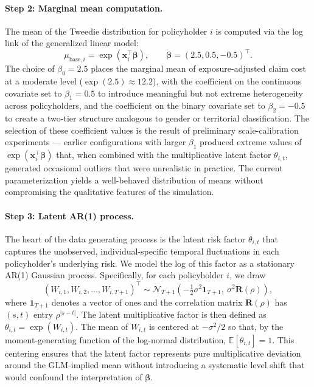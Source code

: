 \documentclass{sfuthesis}
\numberwithin{equation}{chapter}
\begin{document}
\paragraph{Step 2: Marginal mean computation.}
The mean of the Tweedie distribution for policyholder $i$ is computed via the log link of the generalized linear model:
\begin{equation}
\mu_{\text{base}, i} = \exp(\bm{x}_i^\top \bm{\beta}), \qquad \bm{\beta} = (2.5, 0.5, -0.5)^\top.
\label{eq:baseline}
\end{equation}
The choice of $\beta_0 = 2.5$ places the marginal mean of exposure-adjusted claim cost at a moderate level ($\exp(2.5) \approx 12.2$), with the coefficient on the continuous covariate set to $\beta_1 = 0.5$ to introduce meaningful but not extreme heterogeneity across policyholders, and the coefficient on the binary covariate set to $\beta_2 = -0.5$ to create a two-tier structure analogous to gender or territorial classification. The selection of these coefficient values is the result of preliminary scale-calibration experiments --- earlier configurations with larger $\beta_1$ produced extreme values of $\exp(\bm{x}_i^\top \bm{\beta})$ that, when combined with the multiplicative latent factor $\theta_{i,t}$, generated occasional outliers that were unrealistic in practice. The current parameterization yields a well-behaved distribution of means without compromising the qualitative features of the simulation.

\paragraph{Step 3: Latent AR(1) process.}
The heart of the data generating process is the latent risk factor $\theta_{i,t}$ that captures the unobserved, individual-specific temporal fluctuations in each policyholder's underlying risk. We model the log of this factor as a stationary AR(1) Gaussian process. Specifically, for each policyholder $i$, we draw
\begin{equation}
(W_{i,1}, W_{i,2}, \dots, W_{i,T+1})^\top \sim \mathcal{N}_{T+1}\!\left(-\tfrac{1}{2}\sigma^2 \bm{1}_{T+1},\ \sigma^2 \bm{R}(\rho)\right),
\label{eq:latent}
\end{equation}
where $\bm{1}_{T+1}$ denotes a vector of ones and the correlation matrix $\bm{R}(\rho)$ has $(s, t)$ entry $\rho^{|s-t|}$. The latent multiplicative factor is then defined as $\theta_{i,t} = \exp(W_{i,t})$. The mean of $W_{i,t}$ is centered at $-\sigma^2/2$ so that, by the moment-generating function of the log-normal distribution, $\mathbb{E}[\theta_{i,t}] = 1$. This centering ensures that the latent factor represents pure multiplicative deviation around the GLM-implied mean without introducing a systematic level shift that would confound the interpretation of $\bm{\beta}$.
\end{document}
